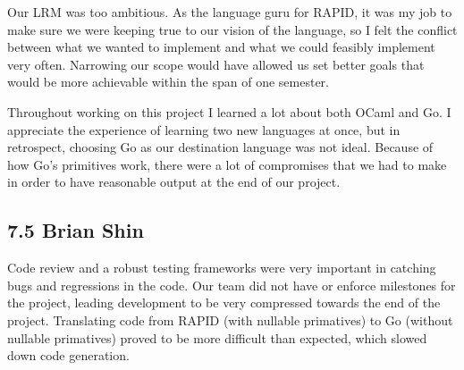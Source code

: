 Our LRM was too ambitious.  As the language guru for RAPID, it was my job to make
sure we were keeping true to our vision of the language, so I felt the conflict
between what we wanted to implement and what we could feasibly implement very
often.  Narrowing our scope would have allowed us set better goals that would be
more achievable within the span of one semester.

Throughout working on this project I learned a lot about both OCaml and Go.  I
appreciate the experience of learning two new languages at once, but in
retrospect, choosing Go as our destination language was not ideal.  Because of
how Go's primitives work, there were a lot of compromises that we had to make
in order to have reasonable output at the end of our project.

\subsection*{7.5 Brian Shin}
Code review and a robust testing frameworks were very important in catching bugs and regressions in the code.
Our team did not have or enforce milestones for the project, leading development to be very compressed towards the end of the project.
Translating code from RAPID (with nullable primatives) to Go (without nullable primatives) proved to be more difficult than expected, which slowed down code generation.
